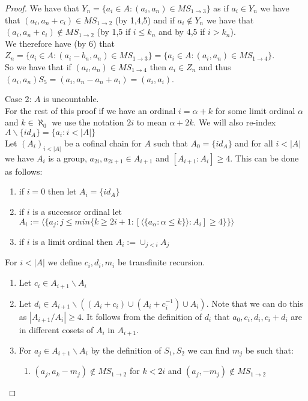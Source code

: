 \documentclass{report}
\begin{document}
\begin{proof}
We have that \(Y_n=\{a_i \in A:(a_i,a_n)\in MS_{1\rightarrow 3}\}\) as if \(a_i\in Y_n\) we have that \((a_i,a_n+c_i)\in MS_{1\rightarrow 2}\) (by 1,4,5) and if \(a_i\notin Y_n\) we have that \((a_i,a_n+c_i)\notin MS_{1 \rightarrow 2}\) (by 1,5 if \(i \leq k_n\) and by 4,5 if \(i>k_n\)).\\
We therefore have (by 6) that \(Z_n=\{a_i\in A:(a_i-b_n,a_n)\in MS_{1 \rightarrow 3}\}=\{a_i\in A:(a_i,a_n)\in MS_{1 \rightarrow 4}\}\).\\
So we have that if \((a_i,a_n)\in MS_{1 \rightarrow 4}\) then \(a_i \in Z_n\) and thus \((a_i,a_n)S_5=(a_i,a_n-a_n+a_i)=(a_i,a_i)\).\\\par
Case 2: \(A\) is uncountable.\\
For the rest of this proof if we have an ordinal \(i=\alpha+k\) for some limit ordinal \(\alpha\) and \(k\in \aleph_0\) we use the notation \(2i\) to mean \(\alpha+2k\). We will also re-index \(A \backslash \{id_A\}=\{a_i:i<|A|\}\)\\ 
Let \((A_i)_{i<|A|}\) be a cofinal  chain for \(A\) such that \(A_0=\{id_A\}\) and for all \(i<|A|\) we have \(A_i\) is a group, \(a_{2i},a_{2i+1}\in A_{i+1}\) and \([A_{i+1}:A_{i}]\geq 4\). This can be done as follows:
\begin{enumerate}
\item if \(i=0\) then let \(A_i=\{id_A\}\)
\item if \(i\) is a successor ordinal let \(A_i:=\langle \{a_j:j\leq min\{k \geq 2i+1:[\langle \{a_\alpha:\alpha \leq k\}\rangle:A_i]\geq 4\}\}\rangle\)
\item if \(i\) is a limit ordinal then \(A_i:=\cup_{j<i} A_j\)
\end{enumerate}
For \(i<|A|\) we define \(c_i,d_i,m_i\) be transfinite recursion.
\begin{enumerate}
\item Let \(c_i\in A_{i+1}\backslash A_i\)
\item Let \(d_i \in A_{i+1}\backslash ((A_{i}+c_i)\cup (A_{i}+c_i^{-1})\cup A_i)\). Note that we can do this as \(|A_{i+1}/A_{i}|\geq 4\). It follows from the definition of \(d_i\) that \(a_0,c_i,d_i,c_i+d_i\) are in different cosets of \(A_i\) in \(A_{i+1}\).
\item For \(a_j \in A_{i+1}\backslash A_{i}\) by the definition of \(S_1,S_2\) we can find \(m_j\) be such that:
\begin{enumerate}
\item \((a_j,a_k-m_j)\notin MS_{1 \rightarrow 2}\) for \(k<2i\) and \((a_j,-m_j)\notin MS_{1\rightarrow 2}\)

\end{enumerate}
\end{enumerate}
\end{proof}
\end{document}
